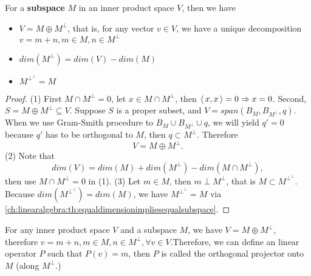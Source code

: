 \begin{refsection}
\begin{theorem}\cite[404]{meyer2000matrix}\label{ch:linearalgebra:th:OrthogonalDecompositionInFiniteLinearSpace}
For a \textbf{subspace} $M$ in an inner product space $V$, then we have
\begin{itemize}
	\item $V = M\oplus M^\perp$, that is, for any vector $v\in V$, we have a unique decomposition $v=m+n,m\in M,n\in M^\perp$
	\item $dim(M^\perp) = dim(V) - dim(M)$
	\item $M^{\perp^\perp} = M$
\end{itemize}
\end{theorem}
\begin{proof}
(1) First $M\cap M^\perp = 0$, let $x\in M\cap M^\perp$, then ${\left< \, x,x \, \right>}=0\Rightarrow x = 0$. Second, $S=M\oplus M^\perp \subseteq V$. Suppose $S$ is a proper subset, and $V = span(B_M,B_{M^\perp},q)$. When we use Gram-Smith procedure to  $B_M\cup B_{M^\perp}\cup q$, we will yield $q' = 0$ because $q'$ has to be orthogonal to $M$, then $q\subset M^\perp$. Therefore $$V = M\oplus M^\perp.$$
(2) Note that $$dim(V) = dim(M) + dim(M^\perp) - dim(M\cap M^\perp),$$ then use $M\cap M^\perp = 0$ in (1). (3) Let $m\in M$, then $m\perp M^\perp$, that is $M \subset M^{\perp^\perp}$. Because $dim(M^{\perp^\perp}) = dim(M)$, we have $M^{\perp^\perp} = M$ via \autoref{ch:linearalgebra:th:equaldimensionimpliesequalsubspace}.  
\end{proof}


\begin{definition}\cite[429]{meyer2000matrix}
For any inner product space $V$ and a subspace $M$, we have $V = M\oplus M^\perp$, therefore $v = m + n, m\in M,n\in M^\perp, \forall v\in V$.Therefore, we can define an linear operator $P$ such that $P(v)= m$, then $P$ is called the orthogonal projector onto $M$ (along $M^\perp$.)
\end{definition}


\end{refsection}
